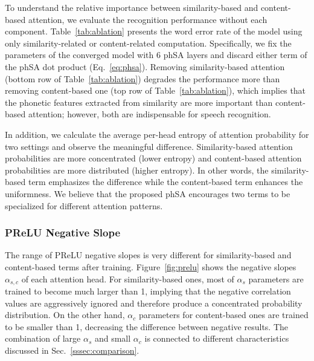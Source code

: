 To understand the relative importance between similarity-based and content-based attention, we evaluate the recognition performance without each component.
Table~\ref{tab:ablation} presents the word error rate of the model using only similarity-related or content-related computation.
Specifically, we fix the parameters of the converged model with 6 phSA layers and discard either term of the phSA dot product (Eq.~\eqref{eq:phsa}).
Removing similarity-based attention (bottom row of Table~\ref{tab:ablation}) degrades the performance more than removing content-based one (top row of Table~\ref{tab:ablation}), which implies that the phonetic features extracted from similarity are more important than content-based attention; however, both are indispensable for speech recognition.

In addition, we calculate the average per-head entropy of attention probability for two settings and observe the meaningful difference.
Similarity-based attention probabilities are more concentrated (lower entropy) and content-based attention probabilities are more distributed (higher entropy).
In other words, the similarity-based term emphasizes the difference while the content-based term enhances the uniformness.
We believe that the proposed phSA encourages two terms to be specialized for different attention patterns.


\subsubsection{PReLU Negative Slope}

The range of PReLU negative slopes is very different for similarity-based and content-based terms after training.
Figure~\ref{fig:prelu} shows the negative slopes $\alpha_{s,c}$ of each attention head.
For similarity-based ones, most of $\alpha_s$ parameters are trained to become much larger than 1, implying that the negative correlation values are aggressively ignored and therefore produce a concentrated probability distribution.
On the other hand, $\alpha_c$ parameters for content-based ones are trained to be smaller than 1, decreasing the difference between negative results.
The combination of large $\alpha_s$ and small $\alpha_c$ is connected to different characteristics discussed in Sec.~\ref{sssec:comparison}.


